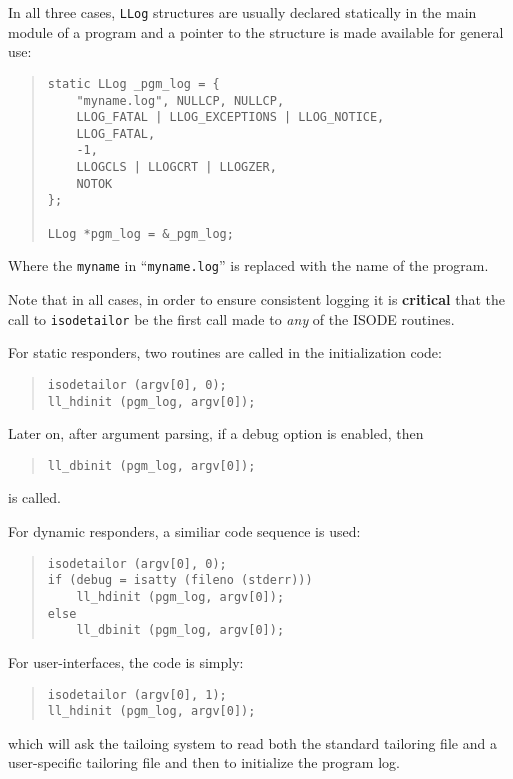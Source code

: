 In all three cases,
\verb"LLog" structures are usually declared statically in the main module of a
program and a pointer to the structure is made available for general use:
\begin{quote}\small\begin{verbatim}
static LLog _pgm_log = {
    "myname.log", NULLCP, NULLCP,
    LLOG_FATAL | LLOG_EXCEPTIONS | LLOG_NOTICE,
    LLOG_FATAL,
    -1,
    LLOGCLS | LLOGCRT | LLOGZER,
    NOTOK
};

LLog *pgm_log = &_pgm_log;
\end{verbatim}\end{quote}
Where the \verb"myname" in ``\verb"myname.log"'' is replaced with the name of
the program.

Note that in all cases,
in order to ensure consistent logging it is {\bf critical\/} that the call to
\verb"isodetailor" be the first call made to {\em any \/} of the ISODE
routines.

For static responders,
two routines are called in the initialization code:
\begin{quote}\small\begin{verbatim}
isodetailor (argv[0], 0);
ll_hdinit (pgm_log, argv[0]);
\end{verbatim}\end{quote}
Later on, after argument parsing, if a debug option is enabled, then
\begin{quote}\small\begin{verbatim}
ll_dbinit (pgm_log, argv[0]);
\end{verbatim}\end{quote}
is called.

For dynamic responders,
a similiar code sequence is used:
\begin{quote}\small\begin{verbatim}
isodetailor (argv[0], 0);
if (debug = isatty (fileno (stderr)))
    ll_hdinit (pgm_log, argv[0]);
else
    ll_dbinit (pgm_log, argv[0]);
\end{verbatim}\end{quote}

For user-interfaces, the code is simply:
\begin{quote}\small\begin{verbatim}
isodetailor (argv[0], 1);
ll_hdinit (pgm_log, argv[0]);
\end{verbatim}\end{quote}
which will ask the tailoing system to read both the standard tailoring file
and a user-specific tailoring file and then to initialize the program log.
